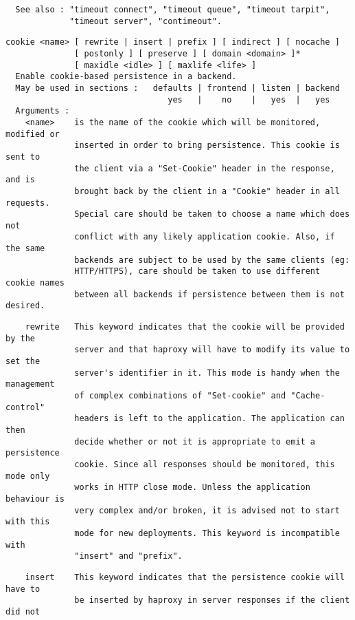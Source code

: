 \begin{verbatim}
  See also : "timeout connect", "timeout queue", "timeout tarpit",
             "timeout server", "contimeout".
\end{verbatim}

\begin{verbatim}
cookie <name> [ rewrite | insert | prefix ] [ indirect ] [ nocache ]
              [ postonly ] [ preserve ] [ domain <domain> ]*
              [ maxidle <idle> ] [ maxlife <life> ]
  Enable cookie-based persistence in a backend.
  May be used in sections :   defaults | frontend | listen | backend
                                 yes   |    no    |   yes  |   yes
  Arguments :
    <name>    is the name of the cookie which will be monitored, modified or
              inserted in order to bring persistence. This cookie is sent to
              the client via a "Set-Cookie" header in the response, and is
              brought back by the client in a "Cookie" header in all requests.
              Special care should be taken to choose a name which does not
              conflict with any likely application cookie. Also, if the same
              backends are subject to be used by the same clients (eg:
              HTTP/HTTPS), care should be taken to use different cookie names
              between all backends if persistence between them is not desired.
\end{verbatim}

\begin{verbatim}
    rewrite   This keyword indicates that the cookie will be provided by the
              server and that haproxy will have to modify its value to set the
              server's identifier in it. This mode is handy when the management
              of complex combinations of "Set-cookie" and "Cache-control"
              headers is left to the application. The application can then
              decide whether or not it is appropriate to emit a persistence
              cookie. Since all responses should be monitored, this mode only
              works in HTTP close mode. Unless the application behaviour is
              very complex and/or broken, it is advised not to start with this
              mode for new deployments. This keyword is incompatible with
              "insert" and "prefix".
\end{verbatim}

\begin{verbatim}
    insert    This keyword indicates that the persistence cookie will have to
              be inserted by haproxy in server responses if the client did not
\end{verbatim}


